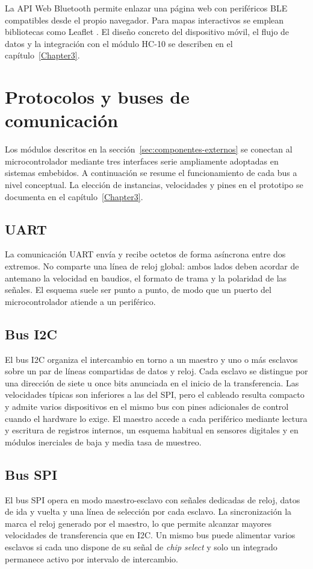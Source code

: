 La API Web Bluetooth \citep{w3c_web_bluetooth} permite enlazar una página web con periféricos BLE compatibles desde el propio navegador. Para mapas interactivos se emplean bibliotecas como Leaflet \citep{leaflet}. El diseño concreto del dispositivo móvil, el flujo de datos y la integración con el módulo HC-10 se describen en el capítulo~\ref{Chapter3}.

\section{Protocolos y buses de comunicación}
\label{sec:protocolos-buses}

Los módulos descritos en la sección~\ref{sec:componentes-externos} se conectan al microcontrolador mediante tres interfaces serie ampliamente adoptadas en sistemas embebidos. A continuación se resume el funcionamiento de cada bus a nivel conceptual. La elección de instancias, velocidades y pines en el prototipo se documenta en el capítulo~\ref{Chapter3}.

\subsection{UART}

La comunicación UART \citep{espressif_uart} envía y recibe octetos de forma asíncrona entre dos extremos. No comparte una línea de reloj global: ambos lados deben acordar de antemano la velocidad en baudios, el formato de trama y la polaridad de las señales. El esquema suele ser punto a punto, de modo que un puerto del microcontrolador atiende a un periférico.

\subsection{Bus I2C}

El bus I2C \citep{nxp_um10204} organiza el intercambio en torno a un maestro y uno o más esclavos sobre un par de líneas compartidas de datos y reloj. Cada esclavo se distingue por una dirección de siete u once bits anunciada en el inicio de la transferencia. Las velocidades típicas son inferiores a las del SPI, pero el cableado resulta compacto y admite varios dispositivos en el mismo bus con pines adicionales de control cuando el hardware lo exige. El maestro accede a cada periférico mediante lectura y escritura de registros internos, un esquema habitual en sensores digitales y en módulos inerciales de baja y media tasa de muestreo.

\subsection{Bus SPI}

El bus SPI \citep{circuitbasics_spi} opera en modo maestro-esclavo con señales dedicadas de reloj, datos de ida y vuelta y una línea de selección por cada esclavo. La sincronización la marca el reloj generado por el maestro, lo que permite alcanzar mayores velocidades de transferencia que en I2C. Un mismo bus puede alimentar varios esclavos si cada uno dispone de su señal de \textit{chip select} y solo un integrado permanece activo por intervalo de intercambio.
